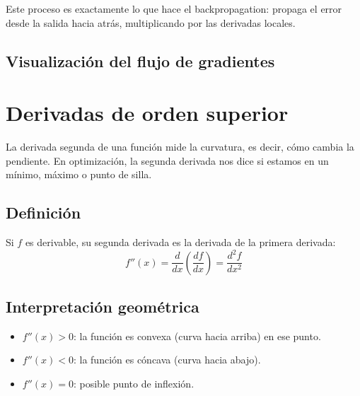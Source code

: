 \documentclass[12pt,a4paper,openany,oneside]{book}
\begin{document}
Este proceso es exactamente lo que hace el backpropagation: propaga el error desde la salida hacia atrás, multiplicando por las derivadas locales.

\subsection{Visualización del flujo de gradientes}
\begin{center}
\end{center}

\section{Derivadas de orden superior}

La derivada segunda de una función mide la curvatura, es decir, cómo cambia la pendiente. En optimización, la segunda derivada nos dice si estamos en un mínimo, máximo o punto de silla.

\subsection{Definición}
Si $f$ es derivable, su segunda derivada es la derivada de la primera derivada:
\[
f''(x) = \frac{d}{dx} \left( \frac{df}{dx} \right) = \frac{d^2f}{dx^2}
\]

\subsection{Interpretación geométrica}
\begin{itemize}
    \item $f''(x) > 0$: la función es convexa (curva hacia arriba) en ese punto.
    \item $f''(x) < 0$: la función es cóncava (curva hacia abajo).
    \item $f''(x) = 0$: posible punto de inflexión.
\end{itemize}
\end{document}
